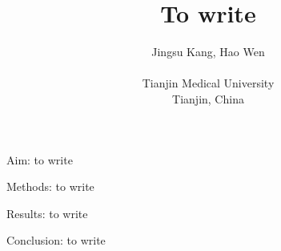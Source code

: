 \documentclass{cinc-abstract}
\begin{document}
\title{To write}

\author {Jingsu Kang, Hao Wen\\ %
\ \\ %
Tianjin Medical University\\  %
Tianjin, China} %

\maketitle



Aim: to write

Methods: to write

Results: to write

Conclusion: to write
\end{document}
